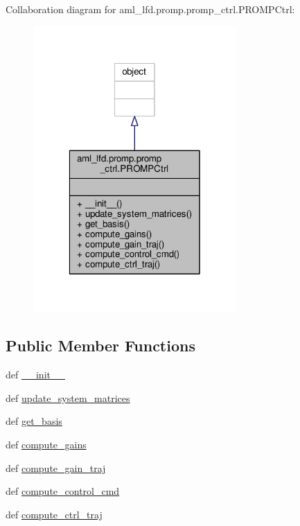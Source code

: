 Collaboration diagram for aml\-\_\-lfd.\-promp.\-promp\-\_\-ctrl.\-P\-R\-O\-M\-P\-Ctrl\-:
\nopagebreak
\begin{figure}[H]
\begin{center}
\leavevmode
\includegraphics[width=220pt]{classaml__lfd_1_1promp_1_1promp__ctrl_1_1_p_r_o_m_p_ctrl__coll__graph}
\end{center}
\end{figure}
\subsection*{Public Member Functions}
\begin{DoxyCompactItemize}
\item 
def \hyperlink{classaml__lfd_1_1promp_1_1promp__ctrl_1_1_p_r_o_m_p_ctrl_a59ffdafad8cd7c38b10d832de14f81ba}{\-\_\-\-\_\-init\-\_\-\-\_\-}
\item 
def \hyperlink{classaml__lfd_1_1promp_1_1promp__ctrl_1_1_p_r_o_m_p_ctrl_a2d9172fcb2061f3a75738be0d1cec04f}{update\-\_\-system\-\_\-matrices}
\item 
def \hyperlink{classaml__lfd_1_1promp_1_1promp__ctrl_1_1_p_r_o_m_p_ctrl_a69c80dc881f0080ad1d4321db0be86f9}{get\-\_\-basis}
\item 
def \hyperlink{classaml__lfd_1_1promp_1_1promp__ctrl_1_1_p_r_o_m_p_ctrl_aa4f2e09432c78502d0c539d5f00bd479}{compute\-\_\-gains}
\item 
def \hyperlink{classaml__lfd_1_1promp_1_1promp__ctrl_1_1_p_r_o_m_p_ctrl_a45927c8b863935f08d4979a99b252741}{compute\-\_\-gain\-\_\-traj}
\item 
def \hyperlink{classaml__lfd_1_1promp_1_1promp__ctrl_1_1_p_r_o_m_p_ctrl_ae8ae663183befe2c2091471c2fb508cd}{compute\-\_\-control\-\_\-cmd}
\item 
def \hyperlink{classaml__lfd_1_1promp_1_1promp__ctrl_1_1_p_r_o_m_p_ctrl_a2ad503db99e10376b97446bb83388cb4}{compute\-\_\-ctrl\-\_\-traj}
\end{DoxyCompactItemize}


